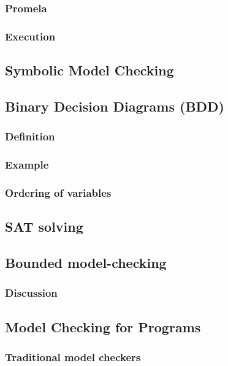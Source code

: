 \documentclass[12pt, a4paper]{book}
\begin{document}
  \subsubsection{Promela}
  \label{subs:Promela}
  \subsubsection{Execution}
  \label{subs:Execution}
  \subsection{Symbolic Model Checking}
  \label{sub:Symbolic Model Checking}
  \subsection{Binary Decision Diagrams (BDD)}
  \label{sub:Binary Decision Diagrams (BDD)}
  \subsubsection{Definition}
  \label{subs:Definition}
  \subsubsection{Example}
  \label{subs:Example}
  \subsubsection{Ordering of variables}
  \label{subs:Ordering of variables}
  \subsection{SAT solving}
  \label{sub:SAT solving}
  \subsection{Bounded model-checking}
  \label{sub:Bounded model-checking}
  \subsubsection{Discussion}
  \label{subs:Discussion}
  \subsection{Model Checking for Programs}
  \label{sub:Model Checking for Programs}
  \subsubsection{Traditional model checkers}
  \label{subs:Traditional model checkers}
\end{document}
